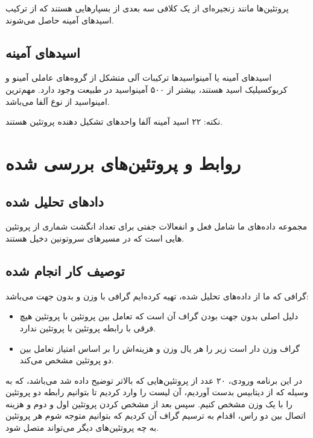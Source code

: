 \documentclass[10pt, a4paper]{article}
\begin{document}
پروتئین‌ها مانند زنجیره‌ای از یک کلافی سه بعدی از بسپار‌هایی هستند که از ترکیب
اسید‌های آمینه حاصل می‌شوند.

\subsection{اسید‌های آمینه}

اسید‌های آمینه یا آمینواسید‌ها ترکیبات آلی متشکل از گروه‌های عاملی آمینو و
کربوکسیلیک اسید هستند، بیشتر از ۵۰۰ آمینواسید در طبیعت وجود دارد. مهم‌ترین
امینواسید از نوع آلفا می‌باشد.

نکته: ۲۲ اسید آمینه آلفا واحد‌های تشکیل دهنده پروتئین هستند.

\section{روابط و پروتئین‌های بررسی شده}

\subsection{دادهای تحلیل شده}

مجموعه داده‌های ما شامل فعل و انفعالات جفتی برای تعداد انگشت شماری از پروتئین
هایی است که در مسیرهای سروتونین دخیل هستند.

\subsection{توصیف کار انجام شده}

گرافی که ما از داده‌های تحلیل شده، تهیه کرده‌ایم گرافی با وزن و بدون جهت
می‌باشد:

\begin{itemize}
    \item دلیل اصلی بدون جهت بودن گراف آن است که تعامل بین پروتئین  با
    پروتئین  هیچ فرقی با رابطه پروتئین  با پروتئین  ندارد.
    \item گراف وزن دار است زیر را هر یال وزن و هزینه‌اش را بر اساس امتیاز تعامل
    بین دو پروتئین مشخص می‌کند.
\end{itemize}

در این برنامه‌ ورودی، ۲۰ عدد از پروتئین‌هایی که بالاتر توضیح داده شد می‌باشد، که
به وسیله  که از دیتابیس  بدست آوردیم، آن لیست را وارد کردیم
تا بتوانیم رابطه دو پروتئین را با یک وزن مشخص کنیم. سپس بعد از مشخص کردن پروتئین
اول و دوم و هزینه اتصال بین دو راس، اقدام به ترسیم گراف آن کردیم که بتوانیم
متوجه شوم هر پروتئین به چه پروتئین‌های دیگر می‌تواند متصل شود.
\end{document}
